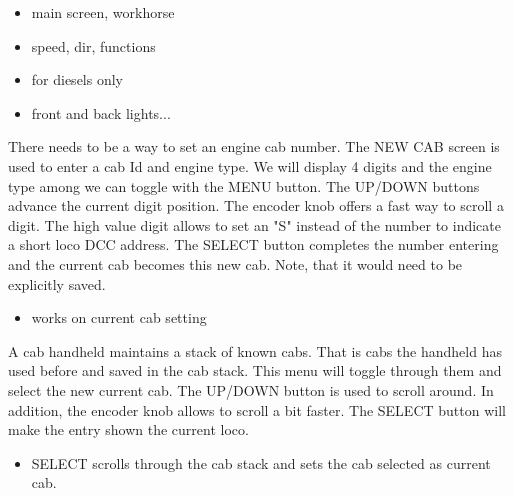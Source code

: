 
\begin{itemize}
\item main screen, workhorse
\item speed, dir, functions
\end{itemize}


\begin{itemize}
\item for diesels only
\end{itemize}


\begin{itemize}
\item front and back lights...
\end{itemize}


There needs to be a way to set an engine cab number. The NEW CAB screen is used to enter a cab Id and engine type. We will display 4 digits and the engine type among we can toggle with the MENU button. The UP/DOWN buttons advance the current digit position. The encoder knob offers a fast way to scroll a digit. The high value digit allows to set an "S" instead of the number to indicate a short loco DCC address. The SELECT button completes the number entering and the current cab becomes this new cab. Note, that it would need to be explicitly saved.

\begin{itemize}
\item works on current cab setting
\end{itemize}


A cab handheld maintains a stack of known cabs. That is cabs the handheld has used before and saved in the cab stack. This menu will toggle through them and select the new current cab. The UP/DOWN button is used to scroll around. In addition, the encoder knob allows to scroll a bit faster. The SELECT button will make the entry shown the current loco.

\begin{itemize}
\item SELECT scrolls through the cab stack and sets the cab selected as current cab.
\end{itemize}

